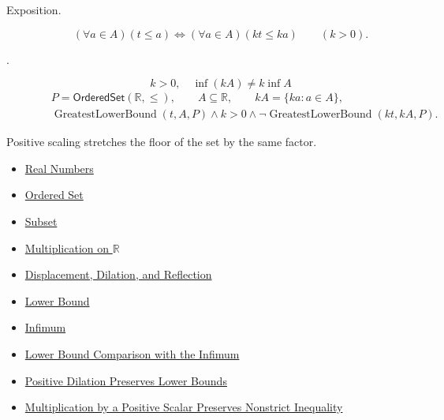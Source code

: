 \begin{remark*}
\begin{description}
  \item[Exposition.]
\[
(\forall a\in A)(t\leq a)
\Longleftrightarrow
(\forall a\in A)(kt\leq ka)
\qquad(k>0).
\]


  \item[.]
  \[
k>0,\quad \inf(kA)\neq k\inf A
\]
\[
\begin{aligned}
&P=\mathsf{OrderedSet}(\mathbb{R},\leq),\qquad A\subseteq\mathbb{R},\qquad kA=\{ka:a\in A\},\\
&\operatorname{GreatestLowerBound}(t,A,P)\land k>0\land
\neg\operatorname{GreatestLowerBound}(kt,kA,P).
\end{aligned}
\]
\end{description}
\end{remark*}

\begin{remark*}[Interpretation]
Positive scaling stretches the floor of the set by the same factor.
\end{remark*}

\begin{dependencies}
\begin{itemize}
  \item \hyperref[def:reals]{Real Numbers}
  \item \hyperref[def:ordered-set]{Ordered Set}
  \item \hyperref[def:subset]{Subset}
  \item \hyperref[def:multiplication-on-r]{Multiplication on $\mathbb{R}$}
  \item \hyperref[def:displacement-dilation-reflection]{Displacement, Dilation, and Reflection}
  \item \hyperref[def:real-lower-bound]{Lower Bound}
  \item \hyperref[def:infimum]{Infimum}
  \item \hyperref[prop:lower-bound-comparison-with-the-infimum]{Lower Bound Comparison with the Infimum}
  \item \hyperref[prop:positive-dilation-preserves-lower-bounds]{Positive Dilation Preserves Lower Bounds}
  \item \hyperref[thm:ineq-nonstrict-multiply-positive]{Multiplication by a Positive Scalar Preserves Nonstrict Inequality}
\end{itemize}
\end{dependencies}


